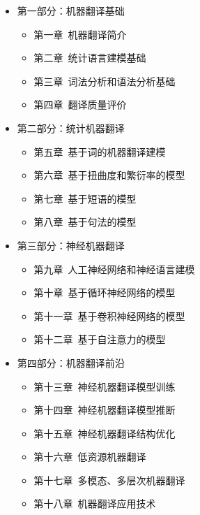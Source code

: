 \begin{spacing}{1.18}
\begin{itemize}
\vspace{0.5em}
\item 第一部分：机器翻译基础
    \begin{itemize}
    \item 第一章\ 机器翻译简介
    \item 第二章\ 统计语言建模基础
    \item 第三章\ 词法分析和语法分析基础
    \item 第四章\ 翻译质量评价
    \end{itemize}
\vspace{0.5em}
\item 第二部分：统计机器翻译
    \begin{itemize}
    \item 第五章\ 基于词的机器翻译建模
    \item 第六章\ 基于扭曲度和繁衍率的模型
    \item 第七章\ 基于短语的模型
    \item 第八章\ 基于句法的模型
    \end{itemize}
\vspace{0.5em}
\item 第三部分：神经机器翻译
    \begin{itemize}
    \item 第九章\ 人工神经网络和神经语言建模
    \item 第十章\ 基于循环神经网络的模型
    \item 第十一章\ 基于卷积神经网络的模型
    \item 第十二章\ 基于自注意力的模型
    \end{itemize}
\vspace{0.5em}
\item 第四部分：机器翻译前沿
    \begin{itemize}
    \item 第十三章\ 神经机器翻译模型训练
    \item 第十四章\ 神经机器翻译模型推断
    \item 第十五章\ 神经机器翻译结构优化
    \item 第十六章\ 低资源机器翻译
    \item 第十七章\ 多模态、多层次机器翻译
    \item 第十八章\ 机器翻译应用技术
    \end{itemize}
\end{itemize}

\vspace{0.5em}


\end{spacing}
